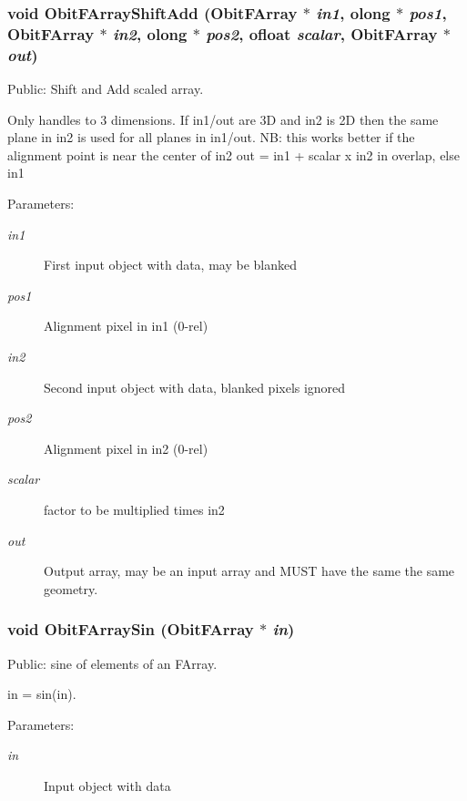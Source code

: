 \subsubsection{\setlength{\rightskip}{0pt plus 5cm}void Obit\-FArray\-Shift\-Add ({\bf Obit\-FArray} $\ast$ {\em in1}, {\bf olong} $\ast$ {\em pos1}, {\bf Obit\-FArray} $\ast$ {\em in2}, {\bf olong} $\ast$ {\em pos2}, {\bf ofloat} {\em scalar}, {\bf Obit\-FArray} $\ast$ {\em out})}\label{ObitFArray_8h_a105}


Public: Shift and Add scaled array. 

Only handles to 3 dimensions. If in1/out are 3D and in2 is 2D then the same plane in in2 is used for all planes in in1/out. NB: this works better if the alignment point is near the center of in2 out = in1 + scalar x in2 in overlap, else in1 \begin{Desc}
\item[Parameters:]
\begin{description}
\item[{\em in1}]First input object with data, may be blanked \item[{\em pos1}]Alignment pixel in in1 (0-rel) \item[{\em in2}]Second input object with data, blanked pixels ignored \item[{\em pos2}]Alignment pixel in in2 (0-rel) \item[{\em scalar}]factor to be multiplied times in2 \item[{\em out}]Output array, may be an input array and MUST have the same the same geometry. \end{description}
\end{Desc}
\subsubsection{\setlength{\rightskip}{0pt plus 5cm}void Obit\-FArray\-Sin ({\bf Obit\-FArray} $\ast$ {\em in})}\label{ObitFArray_8h_a78}


Public: sine of elements of an FArray. 

in = sin(in). \begin{Desc}
\item[Parameters:]
\begin{description}
\item[{\em in}]Input object with data \end{description}
\end{Desc}
